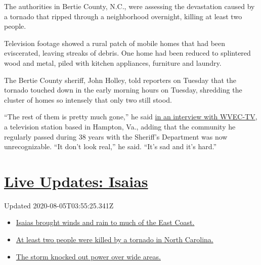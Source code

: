 The authorities in Bertie County, N.C., were assessing the devastation
caused by a tornado that ripped through a neighborhood overnight,
killing at least two people.

Television footage showed a rural patch of mobile homes that had been
eviscerated, leaving streaks of debris. One home had been reduced to
splintered wood and metal, piled with kitchen appliances, furniture and
laundry.

The Bertie County sheriff, John Holley, told reporters on Tuesday that
the tornado touched down in the early morning hours on Tuesday,
shredding the cluster of homes so intensely that only two still stood.

``The rest of them is pretty much gone,'' he said
\href{https://www.13newsnow.com/video/news/local/north-carolina/bertie-county-sheriff-john-holley-talks-about-fatality-in-north-carolina/291-99306d30-d640-4e9a-97fa-0221d565f5df}{in
an interview with WVEC-TV}, a television station based in Hampton, Va.,
adding that the community he regularly passed during 38 years with the
Sheriff's Department was now unrecognizable. ``It don't look real,'' he
said. ``It's sad and it's hard.''

\hypertarget{live-updates-isaias}{%
\section{\texorpdfstring{\href{https://www.nytimes3xbfgragh.onion/2020/08/04/us/isaias-storm-updates.html?action=click\&pgtype=Article\&state=default\&region=MAIN_CONTENT_1\&context=storylines_live_updates}{Live
Updates: Isaias}}{Live Updates: Isaias}}\label{live-updates-isaias}}

Updated 2020-08-05T03:55:25.341Z

\begin{itemize}
\tightlist
\item
  \href{https://www.nytimes3xbfgragh.onion/2020/08/04/us/isaias-storm-updates.html?action=click\&pgtype=Article\&state=default\&region=MAIN_CONTENT_1\&context=storylines_live_updates\#link-38d68049}{Isaias
  brought winds and rain to much of the East Coast.}
\item
  \href{https://www.nytimes3xbfgragh.onion/2020/08/04/us/isaias-storm-updates.html?action=click\&pgtype=Article\&state=default\&region=MAIN_CONTENT_1\&context=storylines_live_updates\#link-7961bdbc}{At
  least two people were killed by a tornado in North Carolina.}
\item
  \href{https://www.nytimes3xbfgragh.onion/2020/08/04/us/isaias-storm-updates.html?action=click\&pgtype=Article\&state=default\&region=MAIN_CONTENT_1\&context=storylines_live_updates\#link-3480f4a1}{The
  storm knocked out power over wide areas.}
\end{itemize}

